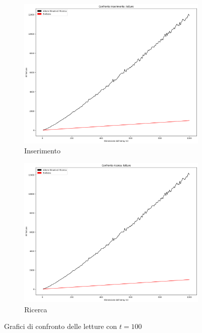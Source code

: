 \begin{figure}[H]
    \centering
    \begin{subfigure}[b]{0.49\textwidth}
        \centering
        \includegraphics[width=\textwidth]{comparison-graphs/insert-r-t100.png}
        \caption{Inserimento}
        \label{fig:compgraphinsertread100}
    \end{subfigure}
    \hfill
    \begin{subfigure}[b]{0.49\textwidth}
        \centering
        \includegraphics[width=\textwidth]{comparison-graphs/search-r-t100.png}
        \caption{Ricerca}
        \label{fig:compgraphsearchread100}
    \end{subfigure}
    \caption{Grafici di confronto delle letture con $t=100$}
    \label{fig:compgraphread100}
\end{figure}

